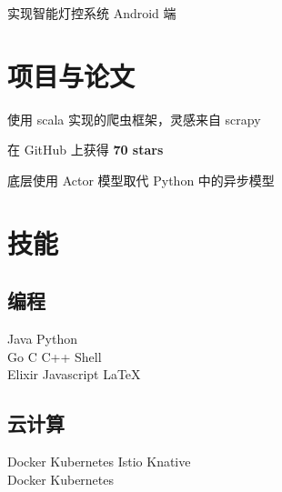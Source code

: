 \documentclass[]{deedy-resume-openfont}
\begin{document}
\begin{minipage}[t]{0.3\textwidth}
\sectionsep
{}
\vspace{\topsep}
\begin{tightemize}
\item 实现智能灯控系统 Android 端
\end{tightemize}
\sectionsep


\section{项目与论文}
\sectionsep

\begin{tightemize}
    \item 使用 scala 实现的爬虫框架，灵感来自 scrapy
    \item 在 GitHub 上获得 \textbf{70 stars}
    \item 底层使用 Actor 模型取代 Python 中的异步模型
    \end{tightemize}
\sectionsep





\section{技能}
\sectionsep
\subsection{编程}
Java \textbullet{} Python  \\
Go \textbullet{} C \textbullet{} C++ \textbullet{} Shell \\
Elixir \textbullet{} Javascript \textbullet{} \LaTeX\ \\ 
\sectionsep

\subsection{云计算}
Docker \textbullet{} Kubernetes \textbullet{} Istio \textbullet{} Knative \\
Docker \textbullet{} Kubernetes  \\
\sectionsep


\end{minipage}
\end{document}
